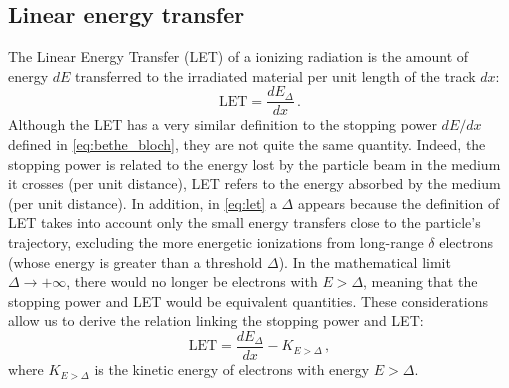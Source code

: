 \subsection{Linear energy transfer}\label{ssec:let}
The Linear Energy Transfer (LET) of a ionizing radiation is the amount of energy $dE$ transferred to the irradiated material per unit length of the track $dx$:
\begin{equation}
	\text{LET}=\frac{dE_\Delta}{dx}\,.
	\label{eq:let}
\end{equation}
Although the LET has a very similar definition to the stopping power $dE/dx$ defined in \autoref{eq:bethe_bloch}, they are not quite the same quantity. Indeed, the stopping power is related to the energy lost by the particle beam in the medium it crosses (per unit distance), LET refers to the energy absorbed by the medium (per unit distance). In addition, in \autoref{eq:let} a $\Delta$ appears because the definition of LET takes into account only the small energy transfers close to the particle's trajectory, excluding the more energetic ionizations from long-range $\delta$ electrons (whose energy is greater than a threshold $\Delta$). In the mathematical limit $\Delta\rightarrow+\infty$, there would no longer be electrons with $E>\Delta$, meaning that the stopping power and LET would be equivalent quantities. These considerations allow us to derive the relation linking the stopping power and LET:
\begin{equation}
	\text{LET}=\frac{dE_\Delta}{dx}-K_{E>\Delta}\,,
	\label{eq:let&stoppingpower}
\end{equation}
where $K_{E>\Delta}$ is the kinetic energy of electrons with energy $E>\Delta$.

